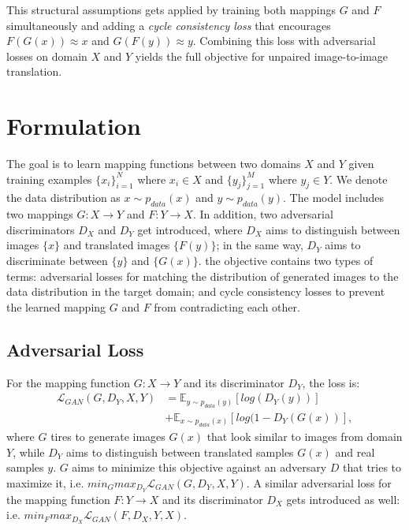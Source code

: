 \documentclass{scrartcl}
\begin{document}
This structural assumptions gets applied by training both mappings $G$ and $F$ simultaneously and adding a \textit{cycle consistency loss} that encourages $F(G(x)) \approx x$ and $G(F(y)) \approx y$. Combining this loss with adversarial losses on domain $X$ and $Y$ yields the full objective for unpaired image-to-image translation.

\section*{Formulation}
The goal is to learn mapping functions between two domains $X$ and $Y$ given training examples $\{x_i\}_{i=1}^N$ where $x_i \in X$ and $\{y_j\}_{j=1}^M$ where $y_j \in Y$. We denote the data distribution as $x \sim p_{data}(x)$ and $y \sim p_{data}(y)$. The model includes two mappings $G: X \rightarrow Y$ and $F: Y \rightarrow X$. In addition, two adversarial discriminators $D_X$ and $D_Y$ get introduced, where $D_X$ aims to distinguish between images $\{x\}$ and translated images $\{F(y)\}$; in the same way, $D_Y$ aims to discriminate between $\{y\}$ and $\{G(x)\}$. the objective contains two types of terms: adversarial losses for matching the distribution of generated images to the data distribution in the target domain; and cycle consistency losses to prevent the learned mapping $G$ and $F$ from contradicting each other.

\subsection*{Adversarial Loss}
For the mapping function $G: X \rightarrow Y$ and its discriminator $D_Y$, the loss is:
\begin{equation}
\begin{split}
\mathcal{L}_{GAN}(G, D_Y, X, Y) &= \mathbb{E}_{y \sim p_{data}(y)} [log(D_Y(y))]\\
 &+ \mathbb{E}_{x \sim p_{data}(x)}[log(1 - D_Y(G(x))],
\end{split}
\end{equation}
where $G$ tires to generate images $G(x)$ that look similar to images from domain $Y$, while $D_Y$ aims to distinguish between translated samples $G(x)$ and real samples $y$. $G$ aims to minimize this objective against an adversary $D$ that tries to maximize it, i.e. $min_G max_{D_Y} \mathcal{L}_{GAN}(G, D_Y, X, Y)$. A similar adversarial loss for the mapping function $F: Y \rightarrow X$ and its discriminator $D_X$ gets introduced as well: i.e. $min_F max_{D_X} \mathcal{L}_{GAN} (F, D_X, Y, X)$.
\end{document}
